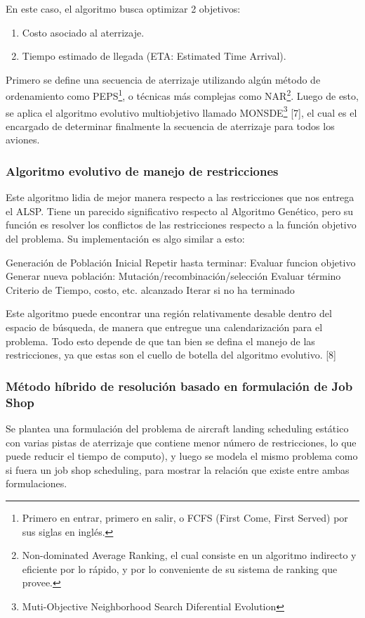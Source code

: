 \documentclass[letter, 11pt]{article}
\begin{document}
En este caso, el algoritmo busca optimizar 2 objetivos:
\begin{enumerate}
\item Costo asociado al aterrizaje.
\item Tiempo estimado de llegada (ETA: Estimated Time Arrival).
\end{enumerate}

Primero se define una secuencia de aterrizaje utilizando algún método de ordenamiento como PEPS\footnote{Primero en entrar, primero en salir, o FCFS (First Come, First Served) por sus siglas en inglés.}, o técnicas más complejas como NAR\footnote{Non-dominated Average Ranking, el cual consiste en un algoritmo indirecto y eficiente por lo rápido, y por lo conveniente de su sistema de ranking que provee.}. Luego de esto, se aplica el algoritmo evolutivo multiobjetivo llamado MONSDE\footnote{Muti-Objective Neighborhood Search Diferential Evolution} [7], el cual es el encargado de determinar finalmente la secuencia de aterrizaje para todos los aviones.

\subsubsection{Algoritmo evolutivo de manejo de restricciones}
Este algoritmo lidia de mejor manera respecto a las restricciones que nos entrega el ALSP. Tiene un parecido significativo respecto al Algoritmo Genético, pero su función es resolver los conflictos de las restricciones respecto a la función objetivo del problema. Su implementación es algo similar a esto:

\begin{verbatimtab}
Generación de Población Inicial
Repetir hasta terminar:
	Evaluar funcion objetivo
	Generar nueva población:
		Mutación/recombinación/selección
	Evaluar término
		Criterio de Tiempo, costo, etc. alcanzado
		Iterar si no ha terminado
\end{verbatimtab}

Este algoritmo puede encontrar una región relativamente desable dentro del espacio de búsqueda, de manera que entregue una calendarización para el problema. Todo esto depende de que tan bien se defina el manejo de las restricciones, ya que estas son el cuello de botella del algoritmo evolutivo. [8]

 \subsubsection{Método híbrido de resolución basado en formulación de Job Shop}
Se plantea una formulación del problema de aircraft landing scheduling estático con varias pistas de aterrizaje que contiene menor número de restricciones, lo que puede reducir el tiempo de computo), y luego se modela el mismo problema como si fuera un job shop scheduling, para mostrar la relación que existe entre ambas formulaciones.
\end{document}
